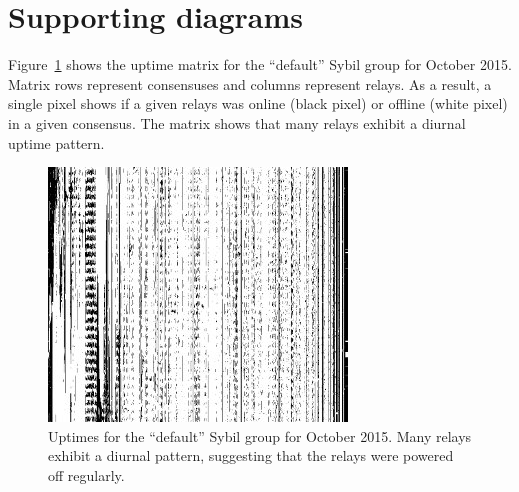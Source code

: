 \section{Supporting diagrams}
Figure~\ref{fig:default-sybils-uptime} shows the uptime matrix for the
``default'' Sybil group for October 2015.  Matrix rows represent consensuses and
columns represent relays.  As a result, a single pixel shows if a given relays
was online (black pixel) or offline (white pixel) in a given consensus.  The
matrix shows that many relays exhibit a diurnal uptime pattern.

\begin{figure}[ht]
	\centering
	\includegraphics[width=0.8\linewidth]{diagrams/default-sybils-2015-10.jpg}
	\caption{Uptimes for the ``default'' Sybil group for October 2015.  Many
	relays exhibit a diurnal pattern, suggesting that the relays were powered
	off regularly.}
	\label{fig:default-sybils-uptime}
\end{figure}
